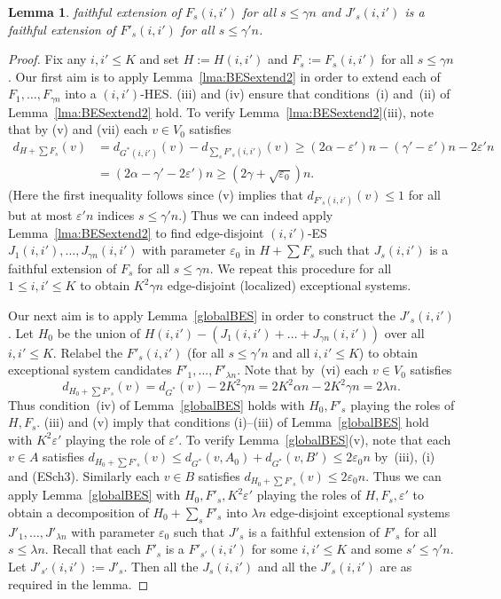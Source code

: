 \documentclass{memo-l}
\newtheorem{lemma}[firstthm]{Lemma}
\def\COMMENT#1{}
\def\eps{\varepsilon}
\numberwithin{section}{chapter}
\numberwithin{equation}{section}
\numberwithin{firstthm}{section}
\numberwithin{figure}{section}
\begin{document}
{\begin{lemma}
faithful extension of $F_s(i,i')$ for all $s \le \gamma n$
and $J'_s(i,i')$ is a faithful extension of $F'_s(i,i')$ for all $s \le \gamma' n$.%
\COMMENT{Added $J'_s(i,i')$ is a faithful extension of $F'_s(i,i')$ instead of $F'_s(i,i') \subseteq J'_s(i,i')$.}
\end{lemma}
\begin{proof}
Fix any $i,i'\le K$ and set $H:=H(i,i')$ and $F_s:=F_s(i,i')$ for all $s\le \gamma n$.
Our first aim is to apply Lemma~\ref{lma:BESextend2} in order to extend each of $F_1, \dots , F_{\gamma n}$
into a $(i,i')$-HES. (iii) and (iv) ensure that conditions~(i) and~(ii) of Lemma~\ref{lma:BESextend2} hold. To verify Lemma~\ref{lma:BESextend2}(iii),
note that by (v) and (vii) each $v\in V_0$ satisfies
\begin{align*}
d_{H + \sum F_s}(v) & = d_{G^*(i,i')}(v)-d_{\sum_s F'_s(i,i')}(v)\ge (2\alpha-\eps')n-(\gamma'-\eps')n-2\eps' n\\
& =(2\alpha-\gamma'-2\eps') n\ge (2\gamma+\sqrt{\eps_0})n.
\end{align*}
(Here the first inequality follows since (v) implies that $d_{F'_s(i,i')}(v)\le 1$ for all but at most $\eps' n$ indices $s\le \gamma' n$.)
Thus we can indeed apply Lemma~\ref{lma:BESextend2} to find edge-disjoint $(i,i')$-ES $J_1(i,i'), \dots ,J_{\gamma n}(i,i')$ with parameter $\eps_0$
in $H + \sum F_s$ such that $J_s(i,i')$ is a faithful extension of $F_s$ for all $s \le \gamma n$.
We repeat this procedure for all $1\le i,i' \le K$ to obtain $K^2\gamma n$
edge-disjoint (localized) exceptional systems. 

Our next aim is to apply Lemma~\ref{globalBES} in order to construct the $J'_s(i,i')$.
Let $H_0$ be the union of $H(i,i')-(J_1(i,i')+\dots+J_{\gamma n}(i,i'))$ over all $i,i'\le K$.
Relabel the $F'_s(i,i')$ (for all $s\le \gamma' n$ and all $i,i'\le K$) to obtain exceptional system candidates $F'_1,\dots,F'_{\lambda n}$.
Note that by~(vi) each $v\in V_0$ satisfies
\begin{equation}\label{eq:degH0}
d_{H_0+\sum F'_s}(v) =d_{G^*}(v)-2K^2 \gamma n= 2K^2\alpha n-2K^2 \gamma n=2\lambda n.
\end{equation}
Thus condition~(iv) of Lemma~\ref{globalBES} holds with $H_0, F'_s$ playing the roles of $H,F_s$.
(iii) and (v) imply that conditions (i)--(iii) of Lemma~\ref{globalBES} hold with $K^2 \eps'$ playing the role of $\eps'$.
To verify Lemma~\ref{globalBES}(v), note that
each $v\in A$ satisfies $d_{H_0+\sum F'_s}(v)\le d_{G^*}(v,A_0)+d_{G^*}(v,B')\le 2\eps_0 n$ by~(iii), (i) and (ESch3).
Similarly each $v\in B$ satisfies $d_{H_0+\sum F'_s}(v)\le 2\eps_0 n$. Thus we can apply
Lemma~\ref{globalBES} with $H_0, F'_s, K^2\eps'$ playing the roles of $H, F_s, \eps'$ to obtain
a decomposition of $H_0+\sum_s F'_s$ into
$\lambda n$ edge-disjoint exceptional systems $J'_1,\dots,J'_{\lambda n}$ with parameter $\eps_0$ such that
$J'_s$ is a faithful extension of $F'_s$ for all $s\le \lambda n$.
Recall that each $F'_s$ is a $F'_{s'}(i,i')$ for some $i,i'\le K$ and some $s'\le \gamma' n$.
Let $J'_{s'}(i,i'):=J'_s$. Then all the $J_s(i,i')$ and all the $J'_s(i,i')$ are as required in the lemma. 
\end{proof}

}
\end{document}
